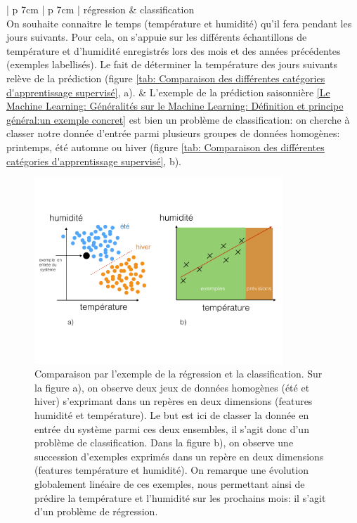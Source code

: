 \begin{table}[h]
	\begin{tabular}{ | p {7cm} | p {7cm} |}
		\hline
		régression & classification \\
		\hline
		On souhaite connaitre le temps (température et humidité) qu'il fera pendant les jours suivants. Pour cela, on s'appuie sur les différents échantillons de température et d'humidité enregistrés lors des mois et des années précédentes (exemples labellisés). Le fait de déterminer la température des jours suivants relève de la prédiction (figure \ref {tab: Comparaison des différentes catégories d'apprentissage supervisé}, a).  
		 &  L'exemple de la prédiction saisonnière \ref{Le Machine Learning: Généralités sur le Machine Learning: Définition et principe général:un exemple concret} est bien un problème de classification: on cherche à classer notre donnée d'entrée parmi plusieurs groupes de données homogènes: printemps, été automne ou hiver (figure \ref {tab: Comparaison des différentes catégories d'apprentissage supervisé}, b). \\
		\hline 
	\end{tabular}
	\caption[Comparaison des différentes catégories d'apprentissage supervisé]{Comparaison entre l'apprentissage supervisé de type régression et supervisé de type classification}
	\label {tab: Comparaison des différentes catégories d'apprentissage supervisé}
\end{table}

\begin{figure}[h]
	\centering\includegraphics[height=7cm]{images/regression_class.jpeg}
	\caption[Comparaison par l'exemple de la régression et la classification]{Comparaison par l'exemple de la régression et la classification. Sur la figure a), on observe deux jeux de données homogènes (été et hiver) s'exprimant dans un repères en deux dimensions (features humidité et température). Le but est ici de classer la donnée en entrée du système parmi ces deux ensembles, il s'agit donc d'un problème de classification. Dans la figure b), on observe une succession d'exemples exprimés dans un repère en deux dimensions (features température et humidité). On remarque une évolution globalement linéaire de ces exemples, nous permettant ainsi de prédire la température et l'humidité sur les prochains mois: il s'agit d'un problème de régression.}
	\label{fig:Comparaison par l'exemple de la régression et la classification}
\end{figure}

